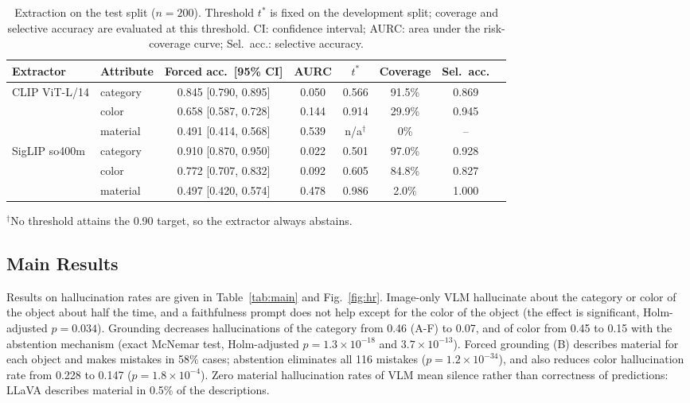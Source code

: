 \documentclass[runningheads]{llncs}
\newcommand{\cond}[1]{\textsf{#1}}
\begin{document}
\begin{table}[!htb]
\caption{Extraction on the test split ($n=200$). Threshold $t^{*}$ is fixed on the development split; coverage and selective accuracy are evaluated at this threshold. CI: confidence interval; AURC: area under the risk-coverage curve; Sel.\ acc.: selective accuracy.}
\label{tab:extraction}
\centering
\footnotesize
\setlength{\tabcolsep}{3.5pt}
\begin{tabular}{@{}llcccccc@{}}
\toprule
Extractor & Attribute & Forced acc.\ [95\% CI] & AURC & $t^{*}$ & Coverage & Sel.\ acc. \\
\midrule
CLIP ViT-L/14 & category & 0.845 [0.790, 0.895] & 0.050 & 0.566 & 91.5\% & 0.869 \\
 & color & 0.658 [0.587, 0.728] & 0.144 & 0.914 & 29.9\% & 0.945 \\
 & material & 0.491 [0.414, 0.568] & 0.539 & n/a$^{\dagger}$ & 0\% & -- \\
\midrule
SigLIP so400m & category & 0.910 [0.870, 0.950] & 0.022 & 0.501 & 97.0\% & 0.928 \\
 & color & 0.772 [0.707, 0.832] & 0.092 & 0.605 & 84.8\% & 0.827 \\
 & material & 0.497 [0.420, 0.574] & 0.478 & 0.986 & 2.0\% & 1.000 \\
\bottomrule
\end{tabular}

\smallskip
\footnotesize $^{\dagger}$No threshold attains the 0.90 target, so the extractor always abstains.
\end{table}

\subsection{Main Results}
Results on hallucination rates are given in Table~\ref{tab:main} and Fig.~\ref{fig:hr}. Image-only VLM hallucinate about the category or color of the object about half the time, and a faithfulness prompt does not help except for the color of the object (the effect is significant, Holm-adjusted $p=0.034$). Grounding decreases hallucinations of the category from 0.46 (\cond{A-F}) to 0.07, and of color from 0.45 to 0.15 with the abstention mechanism (exact McNemar test, Holm-adjusted $p=1.3\times10^{-18}$ and $3.7\times10^{-13}$). Forced grounding (\cond{B}) describes material for each object and makes mistakes in 58\% cases; abstention eliminates all 116 mistakes ($p=1.2\times10^{-34}$), and also reduces color hallucination rate from 0.228 to 0.147 ($p=1.8\times10^{-4}$). Zero material hallucination rates of VLM mean silence rather than correctness of predictions: LLaVA describes material in 0.5\% of the descriptions.
\end{document}
